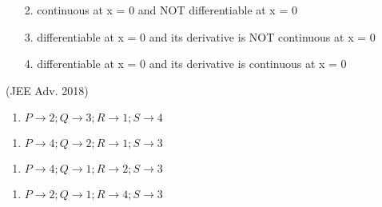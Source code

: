 \documentclass[journal,12pt,twocolumn]{IEEEtran}
\theoremstyle{remark}
\begin{document}
\begin{enumerate}
\begin{multicols}{2}
\begin{enumerate}
					\item[2.]  continuous at x = 0 and NOT differentiable at x = 0
					\item[3.] differentiable at x = 0 and its derivative is NOT continuous at x = 0
					\item[4.] differentiable at x = 0 and its derivative is continuous at x = 0
				\end{enumerate}
                 \hfill(JEE Adv. 2018)
		\end{multicols}
            \begin{multicols}{2}
			\begin{enumerate}[label=(\alph*)]
				\item $P\rightarrow2;Q\rightarrow3;R\rightarrow1;S\rightarrow4$
			\end{enumerate}
			\begin{enumerate}[label=(\alph*), start=3]
				\item $P\rightarrow4;Q\rightarrow2;R\rightarrow1;S\rightarrow3$
			\end{enumerate}
			\columnbreak
			\begin{enumerate}[label=(\alph*), start=2]
				\item $P\rightarrow4;Q\rightarrow1;R\rightarrow2;S\rightarrow3$
			\end{enumerate}
			\begin{enumerate}[label=(\alph*)]
				\item $P\rightarrow2;Q\rightarrow1;R\rightarrow4;S\rightarrow3$
			\end{enumerate}
		\end{multicols}
             \end{enumerate}
\twocolumn
\end{document}
